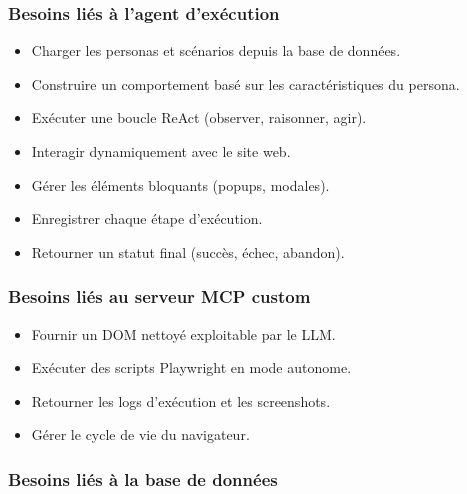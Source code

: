 \subsubsection{Besoins liés à l’agent d’exécution}

\begin{itemize}
\item Charger les personas et scénarios depuis la base de données.\\
\item Construire un comportement basé sur les caractéristiques du persona.\\
\item Exécuter une boucle ReAct (observer, raisonner, agir).\\
\item Interagir dynamiquement avec le site web.\\
\item Gérer les éléments bloquants (popups, modales).\\
\item Enregistrer chaque étape d’exécution.\\
\item Retourner un statut final (succès, échec, abandon).\\
\end{itemize}

\subsubsection{Besoins liés au serveur MCP custom}

\begin{itemize}
\item Fournir un DOM nettoyé exploitable par le LLM.\\
\item Exécuter des scripts Playwright en mode autonome.\\
\item Retourner les logs d’exécution et les screenshots.\\
\item Gérer le cycle de vie du navigateur.\\
\end{itemize}

\subsubsection{Besoins liés à la base de données}

